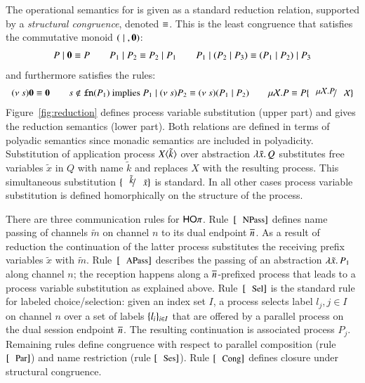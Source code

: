 The operational semantics for \HOp is given as a standard reduction relation, supported by
a \emph{structural congruence}, denoted $\equiv$. This is 
the least congruence that satisfies the commutative monoid $(\;|\;, \mathbf{0})$:
%
\[
	\begin{array}{c}
		P \;|\; \mathbf{0} \equiv P
		\qquad
		P_1 \;|\; P_2 \equiv P_2 \;|\; P_1
		\qquad
		P_1 \;|\; (P_2 \;|\; P_3) \equiv (P_1 \;|\; P_2) \;|\; P_3
	\end{array}
\]
%
\noi and furthermore satisfies the rules:
%
\[
\begin{array}{c}
	\news{s} \inact \scong \inact
	\qquad
	s \notin \fn{P_1} \textrm{  implies  } P_1 \Par \news{s} P_2 \scong \news{s}(P_1 \Par P_2)
	\qquad
	\recp{X}{P} \scong P\subst{\recp{X}{P}}{\rvar{X}}
\end{array}
\]
%
\noi Figure~\ref{fig:reduction} defines
process variable substitution (upper part) and gives the 
reduction semantics (lower part).
Both relations are defined in terms of polyadic semantics since
monadic semantics are included in polyadicity.
Substitution of application process $X\langle \tilde{k} \rangle$
over abstraction $\lambda \tilde{x}.\,Q$ substitutes free variables
$\tilde{x}$ in $Q$ with name $\tilde{k}$ and replaces
$X$ with the resulting process.
This simultaneous substitution $\subst{\tilde{k}}{\tilde{x}}$ is standard.
In all other cases process variable substitution is defined
homorphically on the structure of the process.



There are three communication rules for $\mathsf{HO}\pi$. 
Rule~$\orule{NPass}$ defines name passing 
of channels $\tilde{m}$ on channel $n$ to its dual endpoint $\overline{n}$.
As a result of reduction the continuation of the 
latter process substitutes the receiving prefix variables $\tilde{x}$
with $\tilde{m}$.
Rule~$\orule{APass}$ describes
the passing of an abstraction $\lambda \tilde{x}.\,P_1$
along channel $n$;
the reception happens along a $\overline{n}$-prefixed process that
leads to a process variable substitution as explained above.
Rule~$\orule{Sel}$ is the standard rule for labeled choice/selection:
given an index set $I$, 
a process selects label $l_j, j \in I$ on channel $n$ over a set of
labels $\{l_i\}_{i \in I}$ that are offered by a parallel process
on the dual session endpoint $\overline{n}$.
The resulting continuation is associated process $P_j$.
Remaining rules define congruence 
with respect to parallel composition (rule $\orule{Par}$)
and name restriction (rule $\orule{Ses}$).
Rule $\orule{Cong}$ defines closure under structural congruence.



